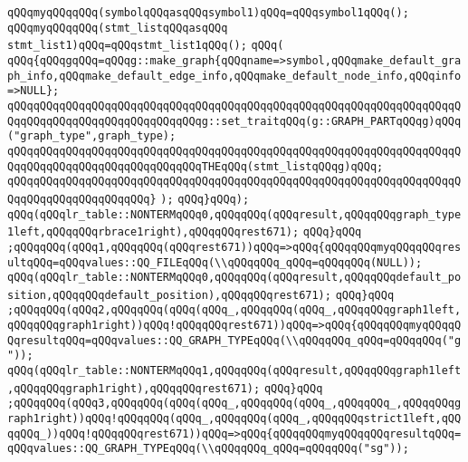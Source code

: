 \verb|qQQqmyqQQqqQQq(symbolqQQqasqQQqsymbol1)qQQq=qQQqsymbol1qQQq();|\newline
\verb|qQQqmyqQQqqQQq(stmt_listqQQqasqQQq|\newline
\verb|stmt_list1)qQQq=qQQqstmt_list1qQQq();|\newline
\verb|qQQq(|\newline
\verb|qQQq{qQQqgqQQq=qQQqg::make_graph{qQQqname=>symbol,qQQqmake_default_graph_info,qQQqmake_default_edge_info,qQQqmake_default_node_info,qQQqinfo=>NULL};|\newline
\newline
\verb|qQQqqQQqqQQqqQQqqQQqqQQqqQQqqQQqqQQqqQQqqQQqqQQqqQQqqQQqqQQqqQQqqQQqqQQqqQQqqQQqqQQqqQQqqQQqqQQqqQQqg::set_traitqQQq(g::GRAPH_PARTqQQqg)qQQq("graph_type",graph_type);|\newline
\verb|qQQqqQQqqQQqqQQqqQQqqQQqqQQqqQQqqQQqqQQqqQQqqQQqqQQqqQQqqQQqqQQqqQQqqQQqqQQqqQQqqQQqqQQqqQQqqQQqqQQqTHEqQQq(stmt_listqQQqg)qQQq;|\newline
\verb|qQQqqQQqqQQqqQQqqQQqqQQqqQQqqQQqqQQqqQQqqQQqqQQqqQQqqQQqqQQqqQQqqQQqqQQqqQQqqQQqqQQqqQQqqQQq}|\newline
\verb|);|\newline
\verb|qQQq}qQQq);|\newline
\verb|qQQq(qQQqlr_table::NONTERMqQQq0,qQQqqQQq(qQQqresult,qQQqqQQqgraph_type1left,qQQqqQQqrbrace1right),qQQqqQQqrest671);|\newline
\verb|qQQq}qQQq|\newline
\verb|;qQQqqQQq(qQQq1,qQQqqQQq(qQQqrest671))qQQq=>qQQq{qQQqqQQqmyqQQqqQQqresultqQQq=qQQqvalues::QQ_FILEqQQq(\\qQQqqQQq_qQQq=qQQqqQQq(NULL));|\newline
\verb|qQQq(qQQqlr_table::NONTERMqQQq0,qQQqqQQq(qQQqresult,qQQqqQQqdefault_position,qQQqqQQqdefault_position),qQQqqQQqrest671);|\newline
\verb|qQQq}qQQq|\newline
\verb|;qQQqqQQq(qQQq2,qQQqqQQq(qQQq(qQQq_,qQQqqQQq(qQQq_,qQQqqQQqgraph1left,qQQqqQQqgraph1right))qQQq!qQQqqQQqrest671))qQQq=>qQQq{qQQqqQQqmyqQQqqQQqresultqQQq=qQQqvalues::QQ_GRAPH_TYPEqQQq(\\qQQqqQQq_qQQq=qQQqqQQq("g"));|\newline
\verb|qQQq(qQQqlr_table::NONTERMqQQq1,qQQqqQQq(qQQqresult,qQQqqQQqgraph1left,qQQqqQQqgraph1right),qQQqqQQqrest671);|\newline
\verb|qQQq}qQQq|\newline
\verb|;qQQqqQQq(qQQq3,qQQqqQQq(qQQq(qQQq_,qQQqqQQq(qQQq_,qQQqqQQq_,qQQqqQQqgraph1right))qQQq!qQQqqQQq(qQQq_,qQQqqQQq(qQQq_,qQQqqQQqstrict1left,qQQqqQQq_))qQQq!qQQqqQQqrest671))qQQq=>qQQq{qQQqqQQqmyqQQqqQQqresultqQQq=qQQqvalues::QQ_GRAPH_TYPEqQQq(\\qQQqqQQq_qQQq=qQQqqQQq("sg"));|\newline
